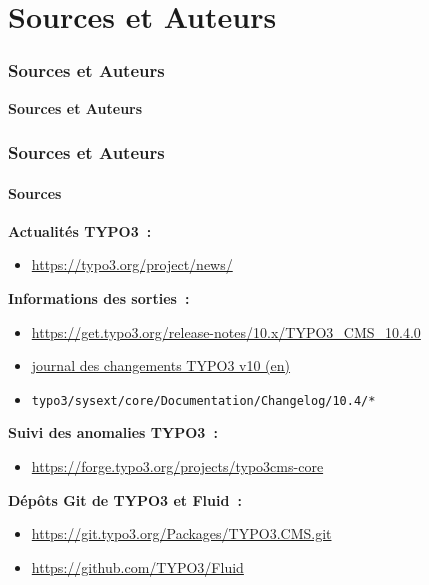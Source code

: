 %

\section{Sources et Auteurs}
\begin{frame}[fragile]
	\frametitle{Sources et Auteurs}

	\begin{center}\huge{\color{typo3darkgrey}\textbf{Sources et Auteurs}}\end{center}
	\begin{center}\large{\textit{}}\end{center}

\end{frame}


\begin{frame}[fragile]
	\frametitle{Sources et Auteurs}
	\framesubtitle{Sources}

	\textbf{Actualités TYPO3~:}
		\begin{itemize}\smaller
			\item \url{https://typo3.org/project/news/}
		\end{itemize}

	\textbf{Informations des sorties~:}
		\begin{itemize}\smaller
			\item \url{https://get.typo3.org/release-notes/10.x/TYPO3_CMS_10.4.0}
			\item \href{https://docs.typo3.org/c/typo3/cms-core/master/en-us/Changelog-10.html}{journal des changements TYPO3 v10 (en)}
			\item \texttt{typo3/sysext/core/Documentation/Changelog/10.4/*}
		\end{itemize}

	\textbf{Suivi des anomalies TYPO3~:}
		\begin{itemize}\smaller
			\item \url{https://forge.typo3.org/projects/typo3cms-core}
		\end{itemize}

	\textbf{Dépôts Git de TYPO3 et Fluid~:}
		\begin{itemize}\smaller
			\item \url{https://git.typo3.org/Packages/TYPO3.CMS.git}
			\item \url{https://github.com/TYPO3/Fluid}
		\end{itemize}

\end{frame}


